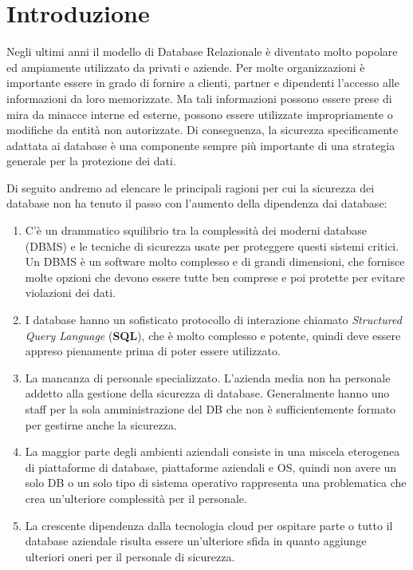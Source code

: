 \section{Introduzione}

Negli ultimi anni il modello di Database Relazionale è diventato molto popolare ed ampiamente utilizzato da
privati e aziende.
Per molte organizzazioni è importante essere in grado di
fornire a clienti, partner e dipendenti l'accesso alle informazioni da loro memorizzate. Ma tali
informazioni possono essere prese di mira da minacce interne ed esterne, possono essere utilizzate
impropriamente o modifiche da entità non autorizzate. Di conseguenza, la sicurezza
specificamente adattata ai database è una componente sempre più importante di una strategia generale per la protezione dei dati.

Di seguito andremo ad elencare le principali ragioni per cui la sicurezza dei database non ha tenuto il passo con
l'aumento della dipendenza dai database:

\begin{enumerate}
    \item C'è un drammatico squilibrio tra la complessità dei moderni
          database (DBMS) e le tecniche di sicurezza usate per proteggere questi
          sistemi critici. Un DBMS è un software molto complesso e di grandi
          dimensioni, che fornisce molte opzioni che devono essere tutte ben
          comprese e poi protette per evitare violazioni dei dati.
    \item I database hanno un sofisticato protocollo di interazione chiamato
          \textit{Structured Query Language} (\textbf{SQL}),
          che è molto complesso e potente, quindi deve essere appreso pienamente
          prima di poter essere utilizzato.
    \item La mancanza di personale specializzato. L'azienda media non ha
          personale addetto alla gestione della sicurezza di database.
          Generalmente hanno uno staff per la sola amministrazione del DB che
          non è sufficientemente formato per gestirne anche la sicurezza.
    \item La maggior parte degli ambienti aziendali consiste in una miscela
          eterogenea di piattaforme di database, piattaforme aziendali e OS,
          quindi non avere un solo DB o un solo tipo di sistema operativo
          rappresenta una problematica che crea un'ulteriore complessità per il
          personale.
    \item La crescente dipendenza dalla tecnologia cloud per ospitare parte o
          tutto il database aziendale risulta essere un'ulteriore sfida in quanto
          aggiunge ulteriori oneri per il
          personale di sicurezza.
\end{enumerate}

